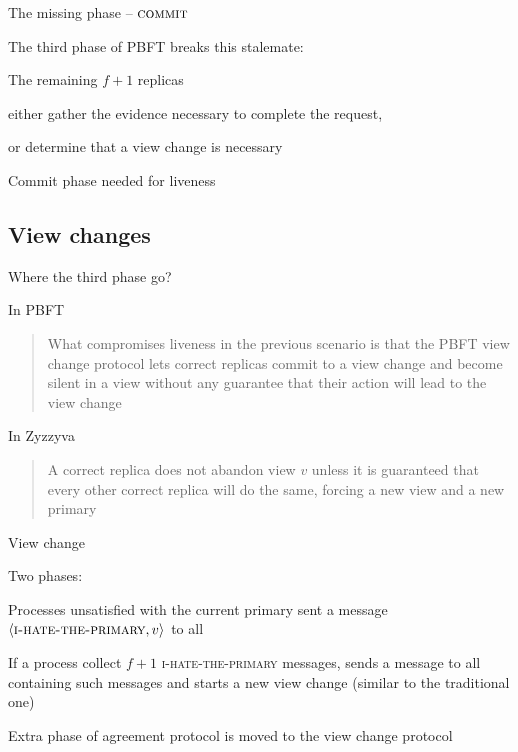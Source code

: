 \begin{frame}{The missing phase -- $\textsc{commit}$}
	
The third phase of PBFT breaks this stalemate:
\BIL
\item The remaining $f+1$ replicas 
\BI
\item either gather the evidence necessary to complete the request,
\item or determine that a view change is necessary
\EI	
\item Commit phase needed for liveness
\EIL
	
\end{frame}

\subsection{View changes}

\begin{frame}{Where the third phase go?}
	
\begin{block}{In PBFT}
\begin{quote}	
What compromises liveness in the previous scenario is that the PBFT view
change protocol lets correct replicas commit to a view change and become
silent in a view without any guarantee that their action will lead to the view
change
\end{quote}
\end{block}

\begin{block}{In Zyzzyva}
\begin{quote}	
A correct replica does not abandon view $v$ unless it is guaranteed that every
other correct replica will do the same, forcing a new view and a new primary
\end{quote}
\end{block}

\end{frame}

\begin{frame}{View change}
	
\BIL
\item Two phases:
\BI
\item Processes unsatisfied with the current primary sent a message
$\langle \textsc{i-hate-the-primary}, v \rangle$ to all
\item If a process collect $f+1$ \textsc{i-hate-the-primary} messages,
sends a message to all containing such messages and starts a new view
change (similar to the traditional one)
\EI
\item Extra phase of agreement protocol is moved to the view change protocol
\EIL
	
\end{frame}	

